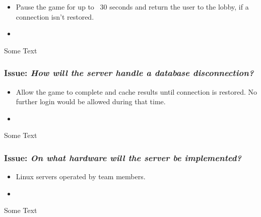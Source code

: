   \begin{itemize}
    \item Pause the game for up to ~30 seconds and return the user to the lobby, if a connection isn't restored.
    \item 
  \end{itemize}

Some Text

\subsubsection*{Issue: \textit{How will the server handle a database disconnection?}}

  \begin{itemize}
    \item Allow the game to complete and cache results until connection is restored. No further login would be allowed during that time.
    \item 
  \end{itemize}

Some Text

\subsubsection*{Issue: \textit{On what hardware will the server be implemented?}}

  \begin{itemize}
    \item Linux servers operated by team members.
    \item 
  \end{itemize}

Some Text
